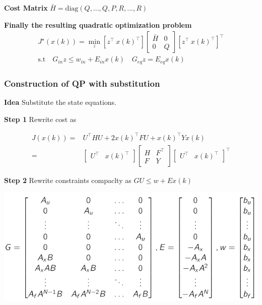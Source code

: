 \textbf{Cost Matrix} $\bar{H} = \mathrm{diag}(Q,..., Q, P, R,..., R)$

\textbf{Finally the resulting quadratic optimization problem}
\[\begin{aligned}
		J^\star(x(k)) = \min_z  \left[ z^\top \ x(k)^\top \right]
		\left[\begin{smallmatrix} \bar{H} & 0 \\ 0 & Q \end{smallmatrix}\right]
		\left[ z^\top \ x(k)^\top \right]^\top \\
		\text{s.t}
		\quad G_{in}z \leq w_{in} + E_{in}x(k)
		\quad	G_{eq}z = E_{eq}x(k)
	\end{aligned}\]

\subsubsection{Construction of QP with substitution}

\textbf{Idea} Substitute the state equations.

\textbf{Step 1} Rewrite cost  as

\[\begin{aligned}
		J(x(k)) = & U^\top HU+2x(k)^\top FU+x(k)^\top Y x(k) \\
		=         & \begin{bmatrix}
			            U^\top & x(k)^\top
		            \end{bmatrix}
		\left[\begin{smallmatrix}
				      H & F^\top \\
				      F & Y
			      \end{smallmatrix}\right]
		\begin{bmatrix}
			U^\top & x(k)^\top
		\end{bmatrix}^\top
	\end{aligned} \]

\textbf{Step 2} Rewrite constraints compaclty as $GU\le w+Ex(k)$

\includegraphics[width=\columnwidth]{images/qp_with_substitution.png}

